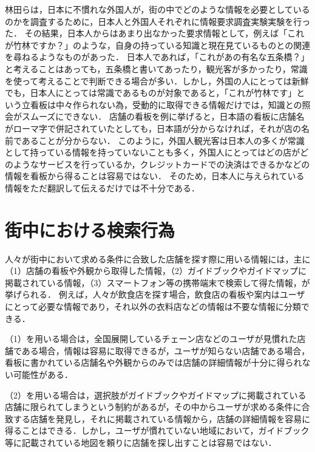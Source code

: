     林田らは，日本に不慣れな外国人が，街の中でどのような情報を必要としているのかを調査するために，日本人と外国人それぞれに情報要求調査実験実験を行った\cite{Hayashida:2005}．
    その結果，日本人からはあまり出なかった要求情報として，例えば「これが竹林ですか？」のような，自身の持っている知識と現在見ているものとの関連を尋ねるようなものがあった．
    日本人であれば，「これがあの有名な五条橋？」と考えることはあっても，五条橋と書いてあったり，観光客が多かったり，常識を使って考えることで判断できる場合が多い．しかし，外国の人にとっては新鮮でも，日本人にとっては常識であるものが対象であると，「これが竹林です」という立看板は中々作られない為，受動的に取得できる情報だけでは，知識との照会がスムーズにできない．
    店舗の看板を例に挙げると，日本語の看板に店舗名がローマ字で併記されていたとしても，日本語が分からなければ，それが店の名前であることが分からない．
    このように，外国人観光客は日本人の多くが常識として持っている情報を持っていないことも多く，外国人にとってはどの店がどのようなサービスを行っているか，クレジットカードでの決済はできるかなどの情報を看板から得ることは容易ではない．
    そのため，日本人に与えられている情報をただ翻訳して伝えるだけでは不十分である．

\section{街中における検索行為}
\label{section:searching_action}
  人々が街中において求める条件に合致した店舗を探す際に用いる情報には，主に（1）店舗の看板や外観から取得した情報，（2）ガイドブックやガイドマップに掲載されている情報，（3）スマートフォン等の携帯端末で検索して得た情報，が挙げられる．
  例えば，人々が飲食店を探す場合，飲食店の看板や案内はユーザにとって必要な情報であり，それ以外の衣料店などの情報は不要な情報に分類できる．

  （1）を用いる場合は，全国展開しているチェーン店などのユーザが見慣れた店舗である場合，情報は容易に取得できるが，ユーザが知らない店舗である場合，看板に書かれている店舗名や外観からのみでは店舗の詳細情報が十分に得られない可能性がある．

  （2）を用いる場合は，選択肢がガイドブックやガイドマップに掲載されている店舗に限られてしまうという制約があるが，その中からユーザが求める条件に合致する店舗を発見し，それに掲載されている情報から，店舗の詳細情報を容易に得ることはできる．しかし，ユーザが慣れていない地域において，ガイドブック等に記載されている地図を頼りに店舗を探し出すことは容易ではない．

